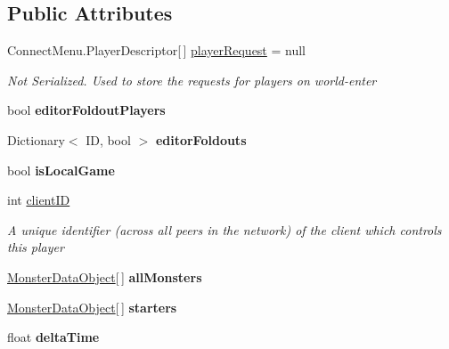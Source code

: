\subsection*{Public Attributes}
\begin{DoxyCompactItemize}
\item 
Connect\-Menu.\-Player\-Descriptor\mbox{[}$\,$\mbox{]} \hyperlink{class_game_state_a8b1949523ac8e40776c0617666023d64}{player\-Request} = null
\begin{DoxyCompactList}\small\item\em Not Serialized. Used to store the requests for players on world-\/enter \end{DoxyCompactList}\item 
\hypertarget{class_game_state_ad68ed3f1f32060bfff68d296e6750712}{bool {\bfseries editor\-Foldout\-Players}}\label{class_game_state_ad68ed3f1f32060bfff68d296e6750712}

\item 
\hypertarget{class_game_state_a47358e83d829da7a28c49f8d0a795125}{Dictionary$<$ I\-D, bool $>$ {\bfseries editor\-Foldouts}}\label{class_game_state_a47358e83d829da7a28c49f8d0a795125}

\item 
\hypertarget{class_game_state_aa4cba70bc38a13e80439dc784c6ca12e}{bool {\bfseries is\-Local\-Game}}\label{class_game_state_aa4cba70bc38a13e80439dc784c6ca12e}

\item 
int \hyperlink{class_game_state_a7c5acf663dc54a1d6de3254209b8fff2}{client\-I\-D}
\begin{DoxyCompactList}\small\item\em A unique identifier (across all peers in the network) of the client which controls this player \end{DoxyCompactList}\item 
\hypertarget{class_game_state_a03d53f629e24c1cc8bcb4a8a61f1bb23}{\hyperlink{class_monster_data_object}{Monster\-Data\-Object}\mbox{[}$\,$\mbox{]} {\bfseries all\-Monsters}}\label{class_game_state_a03d53f629e24c1cc8bcb4a8a61f1bb23}

\item 
\hypertarget{class_game_state_a3d88394849f2356b1c1917f8bb9cc873}{\hyperlink{class_monster_data_object}{Monster\-Data\-Object}\mbox{[}$\,$\mbox{]} {\bfseries starters}}\label{class_game_state_a3d88394849f2356b1c1917f8bb9cc873}

\item 
\hypertarget{class_game_state_a857eed8c97274c3dd9d3eb558a33f855}{float {\bfseries delta\-Time}}\label{class_game_state_a857eed8c97274c3dd9d3eb558a33f855}


\end{DoxyCompactItemize}
